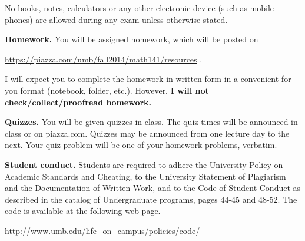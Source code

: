 \documentclass{article}
\begin{document}
No books, notes, calculators or any other electronic device (such as mobile phones) are allowed during any exam unless otherwise stated.

\medskip
\noindent \textbf{Homework.} You will be assigned homework, which will be posted on

\url{https://piazza.com/umb/fall2014/math141/resources} \quad \quad \quad .

\noindent I will expect you to complete the homework in written form in a convenient for you format (notebook, folder, etc.). However, \textbf{I will not check/collect/proofread homework.} 
 
\medskip
\noindent \textbf{Quizzes.} You will be given quizzes in class. The quiz times will be announced in class or on piazza.com. Quizzes may be announced from one lecture day to the next. Your quiz problem will be one of your homework problems, verbatim. 

\medskip
\noindent \textbf{Student conduct.} Students  are required to adhere the University Policy on Academic Standards and Cheating, to the University Statement of Plagiarism and the Documentation of Written Work, and to the Code of Student Conduct as described in the catalog of Undergraduate programs, pages 44-45 and 48-52. The code is available at the following web-page.

\noindent\url{http://www.umb.edu/life_on_campus/policies/code/}
\end{document}

